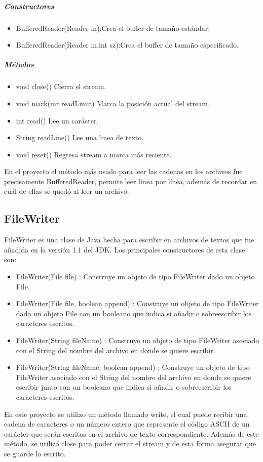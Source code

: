 \documentclass[11pt]{article}
\begin{document}
\subparagraph{Constructores}
\begin{itemize}
\item BufferedReader(Reader in):\quad Crea el buffer de tamaño estándar.
\item BufferedReader(Reader in,int sz):\quad Crea el buffer de tamaño especificado.
\end{itemize}
\subparagraph{Métodos}
\begin{itemize}
\item void close() \quad Cierra el stream.
\item void mark(inr readLimit) \quad Marca la posición actual del stream.
\item int read() \quad Lee un carácter.
\item String readLine() \quad Lee una linea de texto.
\item void reset() \quad Regresa stream a marca más reciente. 
\end{itemize}
En el proyecto el método más usado para leer las cadenas en los archivos fue precisamente BufferedReader, permite leer línea por línea, además de recordar en cuál de ellas se quedó al leer un archivo.

\subsection{FileWriter}

FileWriter es una clase de Java hecha para escribir en archivos de textos que fue añadida en la versión 1.1 del JDK. Los principales constructores de esta clase son:
\begin{itemize}
\item FileWriter(File file) : Construye un objeto de tipo FileWriter dado un objeto File.
\item FileWriter(File file, boolean append) : Construye un objeto de tipo FileWriter dado un objeto File con un booleano que indica si añadir o sobreescribir los caracteres escritos.
\item FileWriter(String fileName) : Construye un objeto de tipo FileWriter asociado con el String del nombre del archivo en donde se quiere escribir.
\item FileWriter(String fileName, boolean append) : Construye un objeto de tipo FileWriter asociado con el String del nombre del archivo en donde se quiere escribir junto con un booleano que indica si añadir o sobreescribir los caracteres escritos.
\end{itemize}
En este proyecto se utilizo un método llamado write, el cual puede recibir una cadena de caracteres o un número entero que represente el código ASCII de un carácter que serán escritos en el archivo de texto correspondiente. Además de este método, se utilizó close para poder cerrar el stream y de esta forma asegurar que se guarde lo escrito.
\end{document}
